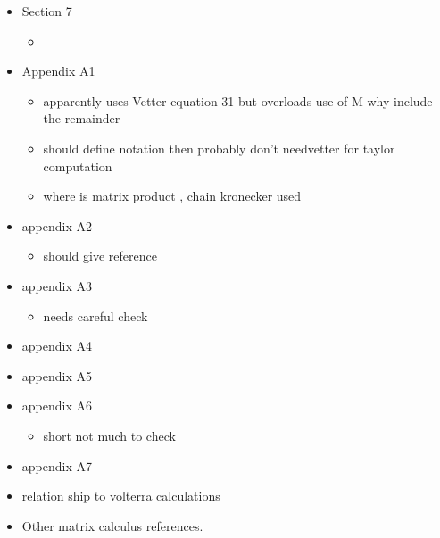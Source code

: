 \documentclass[12pt]{article}
\begin{document}
\begin{itemize}
\item Section 7
  \begin{itemize}
    \item
  \end{itemize}

\item Appendix A1
  \begin{itemize}
  \item apparently uses Vetter equation 31 but overloads use of M  why include the remainder
  \item should define notation then probably don't needvetter for taylor computation
  \item where is matrix product , chain kronecker used
  \end{itemize}
\item appendix A2
  \begin{itemize}
  \item should give reference
  \end{itemize}
\item appendix A3
  \begin{itemize}
  \item needs careful check
  \end{itemize}
\item appendix A4
\item appendix A5
\item appendix A6
  \begin{itemize}
  \item short not much to check
  \end{itemize}
\item appendix A7


\item relation ship to volterra calculations
\item Other matrix calculus references.
\cite{NEUDECKER:88}
\end{itemize}


\end{document}
